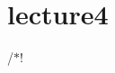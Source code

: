 \chapter{lecture4 }
\hypertarget{md_lecture-notes_2lecture4}{}\label{md_lecture-notes_2lecture4}
/\texorpdfstring{$\ast$}{*}! 